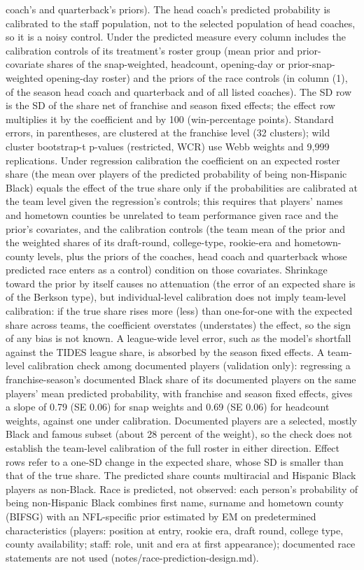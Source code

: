 \begin{table}[!h]
{\begin{threeparttable}
\begin{tablenotes}[para]
coach's and quarterback's priors). The head coach's predicted probability is calibrated to the staff population, not to the selected population of head coaches, so it is a noisy control. Under the predicted measure every column includes the calibration controls of its treatment's roster group (mean prior and prior-covariate shares of the snap-weighted, headcount, opening-day or prior-snap-weighted opening-day roster) and the priors of the race controls (in column (1), of the season head coach and quarterback and of all listed coaches). The SD row is the SD of the share net of franchise and season fixed effects; the effect row multiplies it by the coefficient and by 100 (win-percentage points). Standard errors, in parentheses, are clustered at the franchise level (32 clusters); wild cluster bootstrap-t p-values (restricted, WCR) use Webb weights and 9,999 replications. Under regression calibration the coefficient on an expected roster share (the mean over players of the predicted probability of being non-Hispanic Black) equals the effect of the true share only if the probabilities are calibrated at the team level given the regression's controls; this requires that players' names and hometown counties be unrelated to team performance given race and the prior's covariates, and the calibration controls (the team mean of the prior and the weighted shares of its draft-round, college-type, rookie-era and hometown-county levels, plus the priors of the coaches, head coach and quarterback whose predicted race enters as a control) condition on those covariates. Shrinkage toward the prior by itself causes no attenuation (the error of an expected share is of the Berkson type), but individual-level calibration does not imply team-level calibration: if the true share rises more (less) than one-for-one with the expected share across teams, the coefficient overstates (understates) the effect, so the sign of any bias is not known. A league-wide level error, such as the model's shortfall against the TIDES league share, is absorbed by the season fixed effects. A team-level calibration check among documented players (validation only): regressing a franchise-season's documented Black share of its documented players on the same players' mean predicted probability, with franchise and season fixed effects, gives a slope of 0.79 (SE 0.06) for snap weights and  0.69 (SE 0.06) for headcount weights, against one under calibration. Documented players are a selected, mostly Black and famous subset (about 28 percent of the weight), so the check does not establish the team-level calibration of the full roster in either direction. Effect rows refer to a one-SD change in the expected share, whose SD is smaller than that of the true share. The predicted share counts multiracial and Hispanic Black players as non-Black. Race is predicted, not observed: each person's probability of being non-Hispanic Black combines first name, surname and hometown county (BIFSG) with an NFL-specific prior estimated by EM on predetermined characteristics (players: position at entry, rookie era, draft round, college type, county availability; staff: role, unit and era at first appearance); documented race statements are not used (notes/race-prediction-design.md). 
\end{tablenotes}
\end{threeparttable}}
\end{table}
